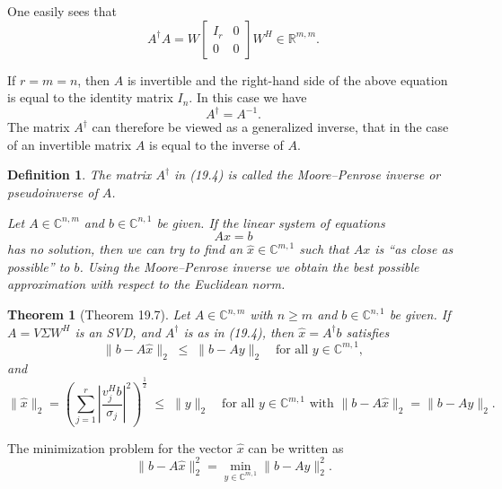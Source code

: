 \documentclass{article}
\newtheorem{theorem}{Theorem}[section] %
\newtheorem{definition}{Definition}[section]
\begin{document}
One easily sees that
\[
A^{\dagger} A = W 
\begin{bmatrix}
I_r & 0 \\
0 & 0
\end{bmatrix}
W^H \in \mathbb{R}^{m,m}.
\]

If $r = m = n$, then $A$ is invertible and the right-hand side of the above equation is 
equal to the identity matrix $I_n$. In this case we have 
\[
A^{\dagger} = A^{-1}.
\]
The matrix $A^{\dagger}$ can therefore be viewed as a generalized inverse, that in the case 
of an invertible matrix $A$ is equal to the inverse of $A$.

\vspace{1cm}

\begin{definition}

The matrix $A^{\dagger}$ in (19.4) is called the \emph{Moore--Penrose inverse} 
or \emph{pseudoinverse} of $A$.  

Let $A \in \mathbb{C}^{n,m}$ and $b \in \mathbb{C}^{n,1}$ be given. If the linear system 
of equations
\[
Ax = b
\]
has no solution, then we can try to find an $\hat{x} \in \mathbb{C}^{m,1}$ such that 
$Ax$ is “as close as possible” to $b$. Using the Moore--Penrose inverse we 
obtain the best possible approximation with respect to the Euclidean norm.

    
\end{definition}

\vspace{1cm}

\begin{theorem}[Theorem 19.7]

    Let $A \in \mathbb{C}^{n,m}$ with $n \geq m$ and $b \in \mathbb{C}^{n,1}$ be given.  
If $A = V \Sigma W^H$ is an SVD, and $A^{\dagger}$ is as in (19.4), then 
$\hat{x} = A^{\dagger} b$ satisfies
\[
\| b - A\hat{x} \|_2 \;\leq\; \| b - Ay \|_2 
\quad \text{for all } y \in \mathbb{C}^{m,1},
\]
and
\[
\| \hat{x} \|_2
= \left( \sum_{j=1}^r 
\left| \frac{v_j^H b}{\sigma_j} \right|^2
\right)^{\tfrac{1}{2}}
\;\leq\; \| y \|_2
\quad \text{for all } y \in \mathbb{C}^{m,1} 
\text{ with } \| b - A\hat{x} \|_2 = \| b - Ay \|_2 .
\]

    
\end{theorem}

\vspace{3cm}

The minimization problem for the vector $\hat{x}$ can be written as
\[
\| b - A\hat{x} \|_2^2 
= \min_{y \in \mathbb{C}^{m,1}} \| b - Ay \|_2^2.
\]
\end{document}
